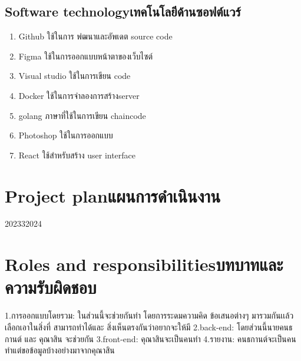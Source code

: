 \subsection{\ifenglish Software technology\else เทคโนโลยีด้านซอฟต์แวร์\fi}
\begin{enumerate}
    \item Github ใช้ในการ พํฒนาและอัพเดต source code 
    \item Figma  ใช้ในการออกแบบหน้าตาของเว็บไซต์
    \item Visual studio ใช้ในการเขียน code
    \item Docker ใช้ในการจำลองการสร้างserver 
    \item golang ภาษาที่ใช้ในการเขียน chaincode 
    \item Photoshop ใช้ในการออกแบบ
    \item React ใช้สำหรับสร้าง user interface
\end{enumerate}
\section{\ifenglish Project plan\else แผนการดำเนินงาน\fi}

\begin{plan}{10}{2023}{3}{2024}
\end{plan}


\section{\ifenglish Roles and responsibilities\else บทบาทและความรับผิดชอบ\fi}


1.การออกแบบโดยรวม: ในส่วนนี้จะช่วยกันทำ โดยการระดมความคิด ข้อเสนอต่างๆ มารวมกันเเล้วเลือกเอาในสิ่งที่ สามารถทำได้และ สิ่งเห็นตรงกันว่าอยากจะให้มี
2.back-end: โดยส่วนนี้นายคนธกานต์ และ คุณาสิน จะช่วยกัน
3.front-end: คุณาสินจะเป็นคนทำ
4.รายงาน: คนธกานต์จะเป็นคนทำแต่ขอข้อมูลบ้างอย่างมาจากคุณาสิน

